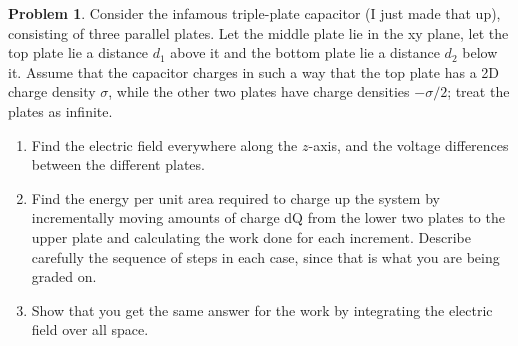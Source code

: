 \documentclass[10pt]{article}
\theoremstyle{definition}
\newtheorem{problem}{Problem}
\begin{document}
\begin{problem}
Consider the infamous triple-plate capacitor (I just made that up), consisting of three parallel plates. Let the
middle plate lie in the xy plane, let the top plate lie a distance $d_1$ above it and the bottom plate lie a distance
$d_2$ below it. Assume that the capacitor charges in such a way that the top plate has a 2D charge density $\sigma$,
while the other two plates have charge densities $-\sigma/2$; treat the plates as infinite.
\begin{enumerate}[label=(\alph*)]
  \item Find the electric field everywhere along the $z$-axis, and the voltage differences between the different plates.
  \item Find the energy per unit area required to charge up the system by incrementally moving amounts of
        charge dQ from the lower two plates to the upper plate and calculating the work done for each increment.
        Describe carefully the sequence of steps in each case, since that is what you are being graded on.
  \item Show that you get the same answer for the work by integrating the electric field over all space.
\end{enumerate}
\end{problem}
\end{document}
